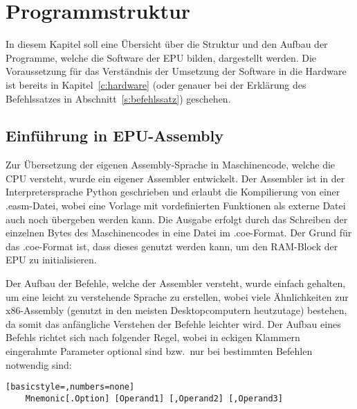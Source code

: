 \captionsetup[figure]{justification=justified,singlelinecheck=false}
\chapter{Programmstruktur}
In diesem Kapitel soll eine Übersicht über die Struktur und den Aufbau der
Programme, welche die Software der EPU bilden, dargestellt werden. Die
Voraussetzung für das Verständnis der Umsetzung der Software in die Hardware
ist bereits in Kapitel~\ref{c:hardware} (oder genauer bei der Erklärung des
Befehlssatzes in Abschnitt~\ref{s:befehlssatz}) geschehen.
\section{Einführung in EPU-Assembly}
Zur Übersetzung der eigenen Assembly-Sprache in Maschinencode, welche die CPU
versteht, wurde ein eigener Assembler entwickelt. Der Assembler ist in der
Interpretersprache Python geschrieben und erlaubt die Kompilierung von einer
.easm-Datei, wobei eine Vorlage mit vordefinierten Funktionen als externe Datei
auch noch übergeben werden kann. Die Ausgabe erfolgt durch das Schreiben der
einzelnen Bytes des Maschinencodes in eine Datei im .coe-Format. Der Grund für
das .coe-Format ist, dass dieses genutzt werden kann, um den RAM-Block der EPU
zu initialisieren.

Der Aufbau der Befehle, welche der Assembler versteht, wurde einfach
gehalten, um eine leicht zu verstehende Sprache zu erstellen, wobei viele
Ähnlichkeiten zur x86-Assembly (genutzt in den meisten Desktopcomputern
heutzutage) bestehen, da somit das anfängliche Verstehen der Befehle leichter
wird. Der Aufbau eines Befehls richtet sich nach folgender Regel, wobei in
eckigen Klammern eingerahmte Parameter optional sind bzw.\ nur bei bestimmten
Befehlen notwendig sind:
\begin{lstlisting}[basicstyle=,numbers=none]
	Mnemonic[.Option] [Operand1] [,Operand2] [,Operand3]
\end{lstlisting}

